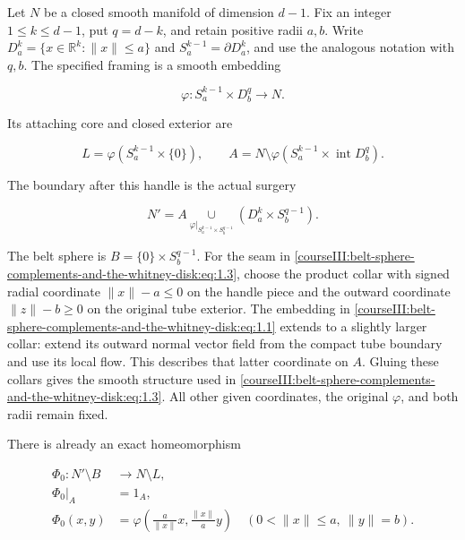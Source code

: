\label{courseIII:belt-sphere-complements-and-the-whitney-disk:section-1}\label{courseIII:belt-complement:1}

Let \(N\) be a closed smooth manifold of dimension \(d-1\). Fix an integer \(1\leq k\leq d-1\), put \(q=d-k\), and retain positive radii \(a,b\). Write \(D_a^k=\{x\in\mathbb R^k:\|x\|\leq a\}\) and \(S_a^{k-1}=\partial D_a^k\), and use the analogous notation with \(q,b\). The specified framing is a smooth embedding

\begin{equation}
\varphi:S_a^{k-1}\times D_b^q\longrightarrow N.
\label{courseIII:belt-sphere-complements-and-the-whitney-disk:eq:1.1}
\end{equation}

Its attaching core and closed exterior are

\begin{equation}
L=\varphi(S_a^{k-1}\times\{0\}),\qquad
A=N\setminus\varphi(S_a^{k-1}\times\operatorname{int}D_b^q).
\label{courseIII:belt-sphere-complements-and-the-whitney-disk:eq:1.2}
\end{equation}

The boundary after this handle is the actual surgery

\begin{equation}
N'=A\underset{\varphi|_{S_a^{k-1}\times S_b^{q-1}}}{\cup}
(D_a^k\times S_b^{q-1}).
\label{courseIII:belt-sphere-complements-and-the-whitney-disk:eq:1.3}
\end{equation}

The belt sphere is \(B=\{0\}\times S_b^{q-1}\). For the seam in \eqref{courseIII:belt-sphere-complements-and-the-whitney-disk:eq:1.3}, choose the product collar with signed radial coordinate \(\|x\|-a\leq0\) on the handle piece and the outward coordinate \(\|z\|-b\geq0\) on the original tube exterior. The embedding in \eqref{courseIII:belt-sphere-complements-and-the-whitney-disk:eq:1.1} extends to a slightly larger collar: extend its outward normal vector field from the compact tube boundary and use its local flow. This describes that latter coordinate on \(A\). Gluing these collars gives the smooth structure used in \eqref{courseIII:belt-sphere-complements-and-the-whitney-disk:eq:1.3}. All other given coordinates, the original \(\varphi\), and both radii remain fixed.

There is already an exact homeomorphism

\begin{equation}
\begin{aligned}
\Phi_0:N'\setminus B&\longrightarrow N\setminus L,\\
\Phi_0|_A&=1_A,\\
\Phi_0(x,y)&=\varphi\left(\frac a{\|x\|}x,\frac{\|x\|}{a}y\right)
\quad(0<\|x\|\leq a,\ \|y\|=b).
\end{aligned}
\label{courseIII:belt-sphere-complements-and-the-whitney-disk:eq:1.4}
\end{equation}

